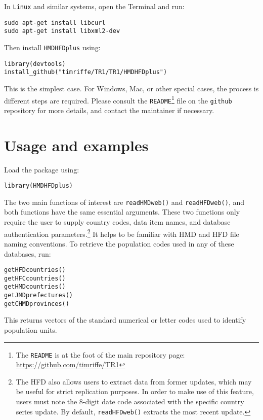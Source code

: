 \documentclass{article}
\begin{document}
In \texttt{Linux} and similar systems, open the Terminal and run:
\begin{verbatim}
sudo apt-get install libcurl
sudo apt-get install libxml2-dev
\end{verbatim}
Then install \texttt{HMDHFDplus} using:
\begin{verbatim}
library(devtools)
install_github("timriffe/TR1/TR1/HMDHFDplus")
\end{verbatim}
This is the simplest case. For Windows, Mac, or other special cases, the process
is different steps are required. Please consult the
\texttt{README}\footnote{The \texttt{README} is at the
foot of the main repository
page: \url{https://github.com/timriffe/TR1}} file on the
\texttt{github} repository for more details, and contact the maintainer if
necessary.

\section{Usage and examples}
Load the package using:
\begin{verbatim}
library(HMDHFDplus)
\end{verbatim}
The two main functions of interest are \texttt{readHMDweb()} and
\texttt{readHFDweb()}, and both functions have the same essential
arguments. These two functions only require the user to supply country codes,
data item names, and database authentication parameters.\footnote{The HFD also
allows users to extract data from former updates, which may be useful for
strict replication purposes. In order to make use of this feature, users must
note the 8-digit date code associated with the specific country series
update. By default, \texttt{readHFDweb()} extracts the most recent update.} It
helps to be familiar with HMD and HFD file naming conventions. To retrieve the population codes used in any of
these databases, run:
\begin{verbatim}
getHFDcountries()
getHFCcountries()
getHMDcountries()
getJMDprefectures()
getCHMDprovinces()
\end{verbatim}
This returns vectors of the standard numerical or letter codes used to identify
population units. 
\end{document}
